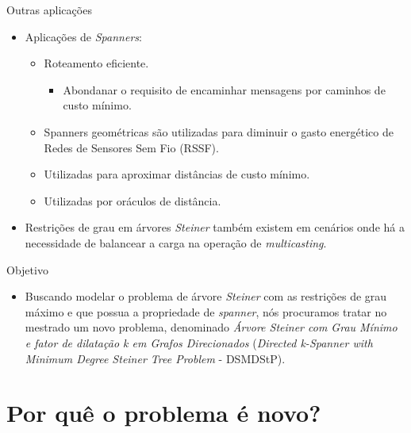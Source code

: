 \documentclass[10pt]{beamer}
\begin{document}
\begin{frame}{Outras aplicações}
  \begin{itemize}
  \item Aplicações de \emph{Spanners}:
  \begin{itemize}
    \item Roteamento eficiente.
    \begin{itemize}
      \item Abondanar o requisito de encaminhar mensagens por caminhos de custo mínimo.
    \end{itemize}

    \item Spanners geométricas são utilizadas para diminuir o gasto energético de Redes de Sensores Sem Fio (RSSF).
    \item Utilizadas para aproximar distâncias de custo mínimo.
    \item Utilizadas por oráculos de distância.
  \end{itemize}
  \item Restrições de grau em árvores \emph{Steiner} também existem em cenários onde há a necessidade de balancear a carga na operação de \emph{multicasting}.
  \end{itemize}
\end{frame}

\begin{frame}{Objetivo}
  \begin{itemize}
  \item Buscando modelar o problema de árvore \emph{Steiner} com as restrições de grau máximo e que possua a propriedade de \emph{spanner}, nós procuramos tratar no mestrado 
um novo problema, denominado \emph{Árvore Steiner com Grau Mínimo e fator de dilatação k em Grafos Direcionados} (\emph{Directed k-Spanner with Minimum Degree Steiner Tree Problem} - 
DSMDStP).
  \end{itemize}
\end{frame}

\section{Por quê o problema é novo?}

\end{document}

